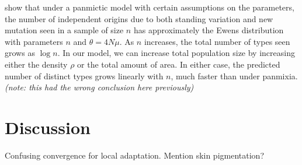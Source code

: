 \documentclass{article}
\newcommand{\plr}[1]{{\it\color{blue}(#1)}}
\begin{document}
\citet{softsweepsII} show that under a panmictic model with certain assumptions on the parameters,
the number of independent origins due to both standing variation and new mutation seen in a sample of size $n$
has approximately the Ewens distribution with parameters $n$ and $\theta = 4 N \mu$.
As $n$ increases, the total number of types seen grows as $\log n$.
In our model, we can increase total population size by increasing either the density $\rho$ or the total amount of area.
In either case, the predicted number of distinct types grows linearly with $n$,
much faster than under panmixia.
\plr{note: this had the wrong conclusion here previously}









\section{Discussion}


Confusing convergence for local adaptation. Mention skin pigmentation?
\end{document}
